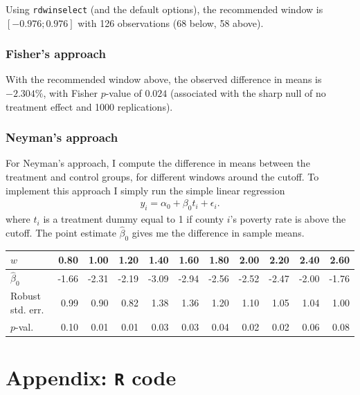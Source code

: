 \documentclass[12pt]{article}
\newcommand{\e}{\epsilon}
\begin{document}
Using \verb|rdwinselect| (and the default options), the recommended window is $[-0.976;0.976]$ with 126 observations (68 below, 58 above).

\subsubsection{Fisher's approach}
With the recommended window above, the observed difference in means is $-2.304\%$, with Fisher $p$-value of $0.024$ (associated with the sharp null of no treatment effect and 1000 replications).

\subsubsection{Neyman's approach}
For Neyman's approach, I compute the difference in means between the treatment and control groups, for different windows around the cutoff. To implement this approach I simply run the simple linear regression
\begin{align*}
y_i = \alpha_0 + \beta_0t_i + \e_i.
\end{align*}
where $t_i$ is a treatment dummy equal to 1 if county $i$'s poverty rate is above the cutoff. The point estimate $\hat{\beta}_0$ gives me the difference in sample means.

\begin{table}[htpb!]
\centering
\begin{tabular}{lrrrrrrrrrr}
  \hline
$w$ & 0.80 & 1.00 & 1.20 & 1.40 & 1.60 & 1.80 & 2.00 & 2.20 & 2.40 & 2.60 \\ 
  \hline
  $\hat{\beta}_0$& -1.66 & -2.31 & -2.19 & -3.09 & -2.94 & -2.56 & -2.52 & -2.47 & -2.00 & -1.76 \\ 
  Robust std. err. & 0.99 & 0.90 & 0.82 & 1.38 & 1.36 & 1.20 & 1.10 & 1.05 & 1.04 & 1.00 \\ 
  $p$-val. & 0.10 & 0.01 & 0.01 & 0.03 & 0.03 & 0.04 & 0.02 & 0.02 & 0.06 & 0.08 \\ 
   \hline
\end{tabular}
\end{table}

\newpage


\section{Appendix: \texttt{R} code}
\end{document}
